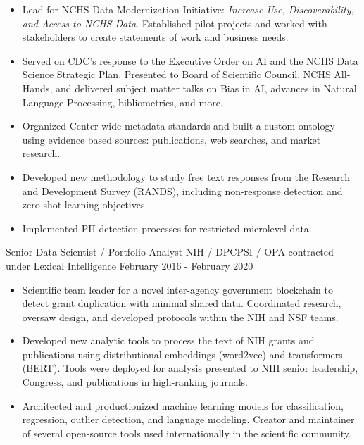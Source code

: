 \documentclass[]{scrartcl}
\begin{document}
\begin{cleanCV}
{\begin{itemize}
   \item Lead for NCHS Data Modernization Initiative: \emph{Increase Use, Discoverability, and Access to NCHS Data}. Established pilot projects and worked with stakeholders to create statements of work and business needs.
   \item Served on CDC's response to the Executive Order on AI and the NCHS Data Science Strategic Plan. Presented to Board of Scientific Council, NCHS All-Hands, and delivered subject matter talks on Bias in AI, advances in Natural Language Processing, bibliometrics, and more.
   \item Organized Center-wide metadata standards and built a custom ontology using evidence based sources: publications, web searches, and market research.
   \item Developed new methodology to study free text responses from the Research and Development Survey (RANDS), including non-response detection and zero-shot learning objectives.
   \item Implemented PII detection processes for restricted microlevel data.
  \end{itemize}
}
  
  \WorkExperience
{}
{Senior Data Scientist / Portfolio Analyst}
{
  \newline NIH / DPCPSI / OPA contracted under Lexical Intelligence
  \newline February 2016 - February 2020
}
{
  \vspace{-1.5em}
  \begin{itemize}
    
    \item Scientific team leader for a novel inter-agency government blockchain to detect grant duplication with minimal shared data. Coordinated research, oversaw design, and developed protocols within the NIH and NSF teams.

    \item Developed new analytic tools to process the text of NIH grants and publications using distributional embeddings (word2vec) and transformers (BERT). Tools were deployed for analysis presented to NIH senior leadership, Congress, and publications in high-ranking journals.

    \item Architected and productionized machine learning models for classification, regression, outlier detection, and language modeling. Creator and maintainer of several open-source tools used internationally in the scientific community.


\end{itemize}}
\end{cleanCV}
\end{document}
